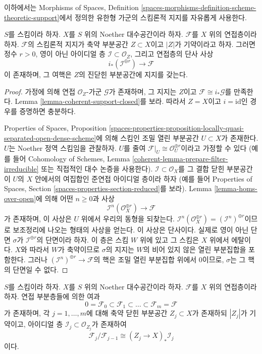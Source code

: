 \noindent
이하에서는 Morphisms of Spaces, Definition
\ref{spaces-morphisms-definition-scheme-theoretic-support}에서 정의한
유한형 가군의 스킴론적 지지를 자유롭게 사용한다.

\begin{lemma}
\label{lemma-prepare-filter-irreducible}
$S$를 스킴이라 하자. $X$를 $S$ 위의 Noether 대수공간이라 하자.
$\mathcal{F}$를 $X$ 위의 연접층이라 하자. $\mathcal{F}$의 스킴론적
지지가 축약 부분공간 $Z \subset X$이고 $|Z|$가 기약이라고 하자.
그러면 정수 $r > 0$, 영이 아닌 아이디얼 층
$\mathcal{I} \subset \mathcal{O}_Z$, 그리고 연접층의 단사 사상
$$
i_*\left(\mathcal{I}^{\oplus r}\right) \to \mathcal{F}
$$
이 존재하며, 그 여핵은 $Z$의 진닫힌 부분공간에 지지를 갖는다.
\end{lemma}

\begin{proof}
가정에 의해 연접 $\mathcal{O}_Z$-가군 $\mathcal{G}$가 존재하며,
그 지지는 $Z$이고 $\mathcal{F} \cong i_*\mathcal{G}$를 만족한다. Lemma
\ref{lemma-coherent-support-closed}를 보라. 따라서 $Z = X$이고
$i = \text{id}$인 경우를 증명하면 충분하다.

\medskip\noindent
Properties of Spaces, Proposition
\ref{spaces-properties-proposition-locally-quasi-separated-open-dense-scheme}에
의해 스킴인 조밀 열린 부분공간 $U \subset X$가 존재한다. $U$는
Noether 정역 스킴임을 관찰하자. $U$를 줄여
$\mathcal{F}|_U \cong \mathcal{O}_U^{\oplus r}$이라고 가정할 수 있다
(예를 들어 Cohomology of Schemes, Lemma
\ref{coherent-lemma-prepare-filter-irreducible} 또는 직접적인 대수 논증을
사용한다). $\mathcal{I} \subset \mathcal{O}_X$를 그 결합 닫힌
부분공간이 $U$의 $X$ 안에서의 여집합인 준연접 아이디얼 층이라 하자
(예를 들어 Properties of Spaces, Section
\ref{spaces-properties-section-reduced}를 보라).
Lemma \ref{lemma-homs-over-open}에 의해 어떤 $n \geq 0$과 사상
$$
\mathcal{I}^n(\mathcal{O}_X^{\oplus r}) \to \mathcal{F}
$$
가 존재하며, 이 사상은 $U$ 위에서 우리의 동형을 되찾는다.
$\mathcal{I}^n(\mathcal{O}_X^{\oplus r}) = (\mathcal{I}^n)^{\oplus r}$이므로
보조정리에 나오는 형태의 사상을 얻는다. 이 사상은 단사이다. 실제로
영이 아닌 단면 $\sigma$가 $\mathcal{I}^{\oplus r}$의 단면이라 하자.
이 층은 스킴 $W$ 위에 있고 그 스킴은 $X$ 위에서 에탈이다.
$X$와 따라서 $W$가 축약이므로 $\sigma$의
지지는 $W$의 비어 있지 않은 열린 부분집합을 포함한다. 그러나
$(\mathcal{I}^n)^{\oplus r} \to \mathcal{F}$의 핵은 조밀 열린
부분집합 위에서 0이므로, $\sigma$는 그 핵의 단면일 수 없다.
\end{proof}

\begin{lemma}
\label{lemma-coherent-filter}
$S$를 스킴이라 하자. $X$를 $S$ 위의 Noether 대수공간이라 하자.
$\mathcal{F}$를 $X$ 위의 연접층이라 하자. 연접 부분층들에 의한 여과
$$
0 = \mathcal{F}_0 \subset \mathcal{F}_1 \subset
\ldots \subset \mathcal{F}_m = \mathcal{F}
$$
가 존재하며, 각 $j = 1, \ldots, m$에 대해 축약 닫힌 부분공간
$Z_j \subset X$가 존재하되 $|Z_j|$가 기약이고, 아이디얼 층
$\mathcal{I}_j \subset \mathcal{O}_{Z_j}$가 존재하여
$$
\mathcal{F}_j/\mathcal{F}_{j - 1}
\cong (Z_j \to X)_* \mathcal{I}_j
$$
이다.
\end{lemma}

